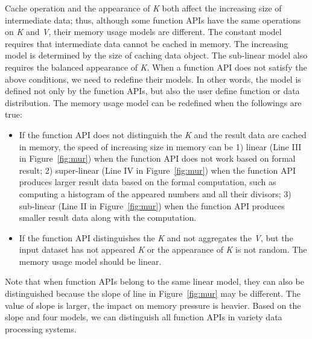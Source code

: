 Cache operation and the appearance of \textit{K} both affect the increasing size of intermediate data; thus, although some function APIs have the same operations on \textit{K} and \textit{V}, their memory usage models are different. The constant model requires that intermediate data cannot be cached in memory. The increasing model is determined by the size of caching data object. The sub-linear model also requires the balanced appearance of \textit{K}. When a function API does not satisfy the above conditions, we need to redefine their models. In other words, the model is defined not only by the function APIs, but also the user define function or data distribution. The memory usage model can be redefined when the followings are true:

\begin{itemize}

\item If the function API does not distinguish the \textit{K} and the result data are cached in memory, the speed of increasing size in memory can be 1) linear (Line III in Figure~\ref{fig:mur}) when the function API does not work based on formal result; 2) super-linear (Line IV in Figure~\ref{fig:mur}) when the function API produces larger result data based on the formal computation, such as computing a histogram of the appeared numbers and all their divisors; 3) sub-linear (Line II in Figure~\ref{fig:mur}) when the function API produces smaller result data along with the computation. 

\item If the function API distinguishes the \textit{K} and not aggregates the \textit{V}, but the input dataset has not appeared \textit{K} or the appearance of \textit{K} is not random. The memory usage model should be linear.

\end{itemize}

Note that when function APIs belong to the same linear model, they can also be distinguished because the slope of line in Figure~\ref{fig:mur} may be different. The value of slope is larger, the impact on memory pressure is heavier. Based on the slope and four models, we can distinguish all function APIs in variety data processing systems.


